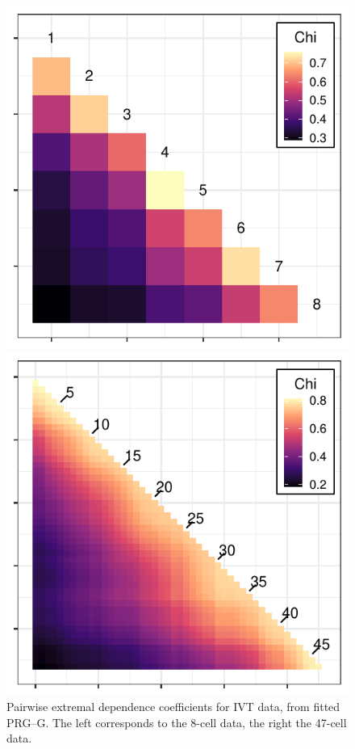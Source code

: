 \begin{figure}[ht]
    \centering
    \caption{Pairwise extremal dependence coefficients for IVT data, from fitted PRG--G.  
    The left corresponds to the 8-cell data, the right the 47-cell data.\label{fig:chi_ij}}
    \begin{minipage}{.49\textwidth}
      \centering
      \includegraphics[width=0.99\linewidth]{./images/chi_ij_8}
    \end{minipage}
    \begin{minipage}{.49\textwidth}
      \centering
      \includegraphics[width=0.99\linewidth]{./images/chi_ij_46}
    \end{minipage}
\end{figure}

